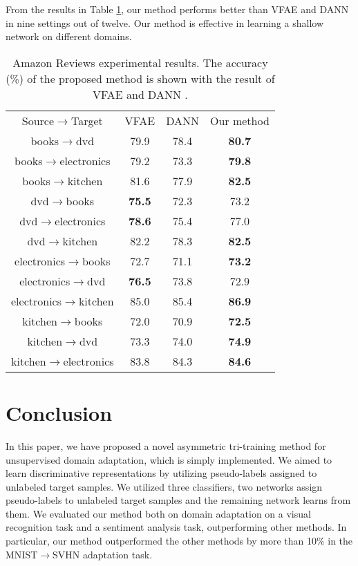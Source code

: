 \documentclass{article}
\begin{document}
From the results in Table \ref{table:amazon}, our method performs better than VFAE \cite{louizos2015variational} and DANN \cite{ganin2016domain} in nine settings out of twelve. Our method is effective in learning a shallow network on different domains. 
\begin{table}
\begin{center}
\begin{tabular}{c||c|c|c}
\toprule
\multirow{2}{*}{Source$\rightarrow$Target}&\multirow{2}{*}{VFAE}&\multirow{2}{*}{DANN}&\multirow{2}{*}{Our method}\\
&&&\\\midrule
books$\rightarrow$dvd&79.9&78.4&{\bf 80.7}\\
 books$\rightarrow$electronics&79.2&73.3&{\bf 79.8}\\
 books$\rightarrow$kitchen&81.6&77.9&{\bf82.5}\\
 dvd$\rightarrow$books&{\bf75.5}&72.3&73.2\\
 dvd$\rightarrow$electronics&{\bf 78.6}&75.4&77.0\\
 dvd$\rightarrow$kitchen&82.2&78.3&{\bf 82.5}\\
 electronics$\rightarrow$books&72.7&71.1&{\bf73.2}\\
 electronics$\rightarrow$dvd&{\bf76.5}&73.8&72.9\\
 electronics$\rightarrow$kitchen&85.0&85.4&{\bf 86.9}\\
 kitchen$\rightarrow$books&72.0&70.9&{\bf 72.5}\\
 kitchen$\rightarrow$dvd&73.3&74.0&{\bf 74.9}\\
 kitchen$\rightarrow$electronics&83.8&84.3&{\bf 84.6}\\\bottomrule
\end{tabular}
\caption{Amazon Reviews experimental results. The accuracy (\%) of the proposed method is shown with the result of VFAE \cite{louizos2015variational} and DANN \cite{ganin2016domain}.}
\label{table:amazon}
\end{center}
\end{table}
\vspace{-2mm}
\section{Conclusion}
In this paper, we have proposed a novel asymmetric tri-training method for unsupervised domain adaptation, which is simply implemented. We aimed to learn discriminative representations by utilizing pseudo-labels assigned to unlabeled target samples. 
We utilized three classifiers, two networks assign pseudo-labels to unlabeled target samples and the remaining network learns from them.
We evaluated our method both on domain adaptation on a visual recognition task and a sentiment analysis task, outperforming other methods. In particular, our method outperformed the other methods by more than 10\% in the MNIST$\rightarrow$SVHN adaptation task.
\end{document}
